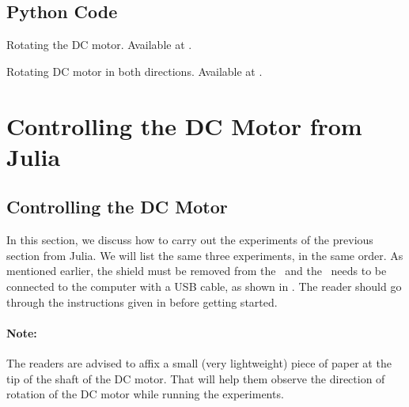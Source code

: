 

\subsection{Python Code}
\label{sec:dcmotor-python-code}

\begin{pycode}
  {Rotating the DC motor.  Available at
    .}
  \label{py:dcmotor-clock}
  
\end{pycode}

\begin{pycode}
  {Rotating DC motor in both directions.  Available at
    .}
  \label{py:dcmotor-both}
  
\end{pycode}

\begin{pycode}
  \label{py:dcmotor-loop}
  
\end{pycode}

\section{Controlling the DC Motor from Julia}
\subsection{Controlling the DC Motor}
In this section, we discuss how to carry out the experiments of the
previous section from Julia.  We will list the same three experiments,
in the same order. As mentioned earlier, the shield must be removed from 
the \arduino\ and the \arduino\ needs to be connected to the computer 
with a USB cable, as shown in . The reader should go through the instructions given in  before getting started.

\paragraph{Note:} The readers are advised to affix a small 
(very lightweight) piece of paper at the tip of the shaft of the DC motor. 
That will help them observe the direction of rotation 
of the DC motor while running the experiments.

